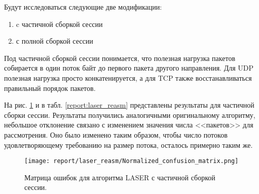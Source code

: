 Будут исследоваться следующие две модификации:

\begin{enumerate}
    \item c частичной сборкой сессии
    \item с полной сборкой сессии
\end{enumerate}

Под частичной сборкой сессии понимается, что полезная нагрузка пакетов собирается в один поток байт до первого пакета другого направления.
Для UDP полезная нагрузка просто конкатенируется, а для TCP также восстанавливаться правильный порядок пакетов.

На рис. \ref{matrix:laser_reasm} и в табл. \ref{report:laser_reasm} представлены результаты для частичной сборки сессии.
Результаты получились аналогичными оригинальному алгоритму,
небольшое отклонение связано с изменением значения числа <<пакетов>> для рассмотрения.
Оно было изменено таким образом, чтобы число потоков удовлетворяющему требованию на размер потока, осталось примерно таким же.

\begin{figure}[H!]
    \begin{center}
        \texttt{[image: report/laser\_reasm/Normalized\_confusion\_matrix.png]}
        \caption{Матрица ошибок для алгоритма LASER с частичной сборкой сессии.}
        \label{matrix:laser_reasm}
    \end{center}
\end{figure}

